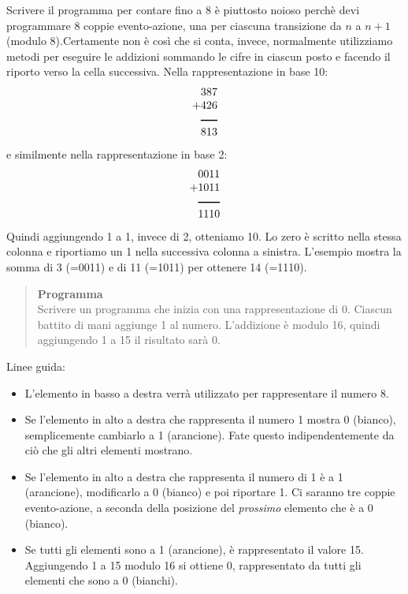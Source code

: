 Scrivere il programma per contare fino a 8 è piuttosto noioso perchè devi programmare 8 coppie evento-azione, una per ciascuna transizione da $n$ a $n+1$ (modulo 8).Certamente non è così che si conta, 
invece, normalmente utilizziamo metodi per eseguire le addizioni sommando le cifre in ciascun posto e facendo il riporto verso la cella successiva.
Nella rappresentazione in base 10:
\begin{displaymath}
\begin{array}{r}
387\\
+426\\
\rule[1pt]{1.5em}{1pt}\\
813\\
\end{array}
\end{displaymath}
e similmente nella rappresentazione in base 2:
\begin{displaymath}
\begin{array}{r}
0011\\
+1011\\
\rule[1pt]{2em}{1pt}\\
1110\\
\end{array}
\end{displaymath}
Quindi aggiungendo 1 a 1, invece di 2, otteniamo 10.
Lo zero è scritto nella stessa colonna e riportiamo un 1 nella successiva colonna a sinistra. 
L'esempio mostra la somma di  3 (=0011) e di 11 (=1011)
per ottenere 14 (=1110).

\begin{quote}
\textbf{Programma}\\
Scrivere un programma che inizia con una rappresentazione di 0.
Ciascun battito di mani aggiunge 1 al numero.
L'addizione è modulo 16, quindi aggiungendo 1 a 15 il risultato sarà 0.
\end{quote}

Linee guida:

\begin{itemize}
\item L'elemento in basso a destra verrà utilizzato per rappresentare il numero 8.
\item Se l'elemento in alto a destra che rappresenta il numero
1 mostra 0 (bianco),
semplicemente cambiarlo a 1 (arancione). Fate questo indipendentemente da ciò che gli altri
elementi mostrano.
\item Se l'elemento in alto a destra che rappresenta il numero di 1
è a 1 (arancione),
modificarlo a 0 (bianco) e poi riportare 1.
Ci saranno tre coppie evento-azione,
a seconda della posizione del \emph{prossimo} elemento che è a 0
(bianco).
\item Se tutti gli elementi sono a 1 (arancione), è rappresentato il valore 15.
Aggiungendo 1 a 15 modulo 16 si ottiene 0, rappresentato da tutti gli elementi
che sono a 0 (bianchi).
\end{itemize}


